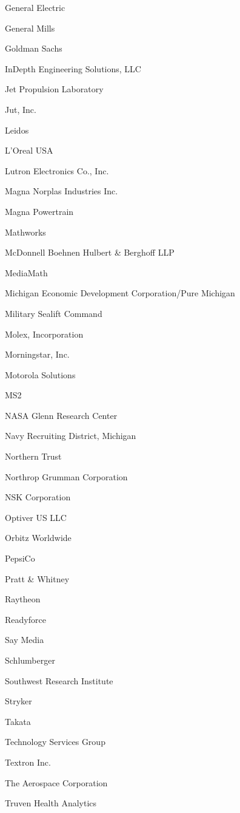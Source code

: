\documentclass[twoside]{article}
\begin{document}
\begin{center}
\begin{multicols}{5}
\begin{FlushLeft}
\begin{compactitem}
\item General Electric
\item General Mills
\item Goldman Sachs
\item InDepth Engineering Solutions, LLC
\item Jet Propulsion Laboratory
\item Jut, Inc.
\item Leidos
\item L'Oreal USA
\item Lutron Electronics Co., Inc.
\item Magna Norplas Industries Inc.
\item Magna Powertrain
\item Mathworks
\item McDonnell Boehnen Hulbert \& Berghoff LLP
\item MediaMath
\item Michigan Economic Development Corporation/Pure Michigan
\item Military Sealift Command
\item Molex, Incorporation
\item Morningstar, Inc.
\item Motorola Solutions
\item MS2
\item NASA Glenn Research Center
\item Navy Recruiting District, Michigan
\item Northern Trust
\item Northrop Grumman Corporation
\item NSK Corporation
\item Optiver US LLC
\item Orbitz Worldwide
\item PepsiCo
\item Pratt \& Whitney
\item Raytheon
\item Readyforce
\item Say Media
\item Schlumberger
\item Southwest Research Institute
\item Stryker
\item Takata
\item Technology Services Group
\item Textron Inc.
\item The Aerospace Corporation
\item Truven Health Analytics

\end{compactitem}
\end{FlushLeft}
\end{multicols}
\end{center}
\end{document}
